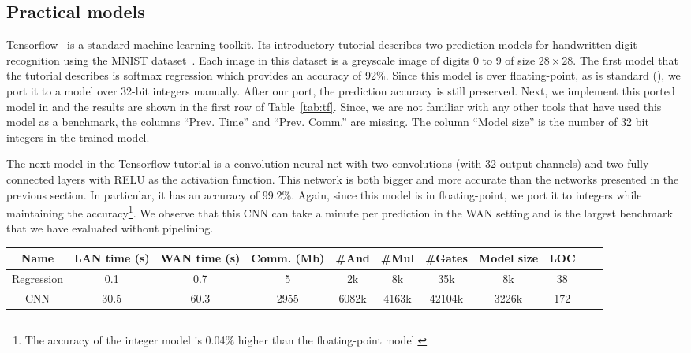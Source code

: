 \subsection{Practical models}
Tensorflow~\cite{tensorflow} is a standard machine learning toolkit.
Its introductory tutorial describes two prediction models for handwritten digit recognition
using the MNIST dataset~\cite{mnist}.
Each image in this dataset is a greyscale image of digits 0 to 9 of size $28\times 28$.
The first model that the tutorial describes is softmax regression
which provides an accuracy of 92\%. Since this model is over floating-point,
as is standard (\cite{secureml,minionn}), we port it to a model over 32-bit integers manually. After our port, the prediction accuracy is still preserved.
Next, we implement this ported model in \tool and the results are shown in the first row of Table~\ref{tab:tf}.
Since, we are not familiar with any other tools that have used this model as a benchmark,
the columns ``Prev. Time'' and ``Prev. Comm.'' are missing.
The column ``Model size'' is the number of 32 bit integers in the trained model.


The next model in the Tensorflow tutorial is a convolution neural net with two convolutions
(with 32 output channels) and two fully connected layers with RELU as the activation function.
This network is both bigger and more accurate than the networks presented in the previous section.
In particular, it has an accuracy of 99.2\%. Again, since this model is in floating-point,
we port it to integers while maintaining the accuracy\footnote{The accuracy of the integer model is 0.04\% higher than the floating-point model.}.
We observe that this CNN can take a minute per prediction in the WAN setting and is the largest
benchmark that we have evaluated without pipelining.



\begin{table*}
\begin{tabular}{c|c|c|c |c|c|c|c|c|c | c}
Name       & LAN time (s) & WAN time (s) & Comm. (Mb)  & \#And & \#Mul & \#Gates & Model size & LOC\\
\hline
Regression &  0.1         & 0.7         & 5            & 2k    & 8k    &  35k    & 8k   & 38\\
\hline
CNN        &  30.5        & 60.3        & 2955         & 6082k & 4163k &  42104k & 3226k& 172\\
\hline
\end{tabular}

 \caption{Tensorflow tutorial benchmarks}
 \label{tab:tf} 
\end{table*}


